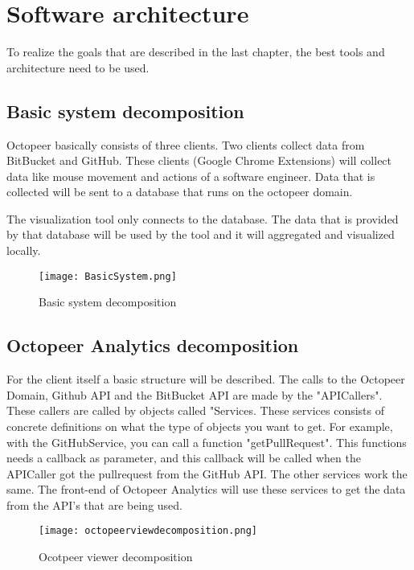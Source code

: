 \documentclass{article}
\begin{document}
\section{Software architecture}

To realize the goals that are described in the last chapter, the best tools and architecture need to be used.

\subsection{Basic system decomposition}

Octopeer basically consists of three clients. Two clients collect data from BitBucket and GitHub. These clients (Google Chrome Extensions) will collect data like mouse movement and actions of a software engineer. Data that is collected will be sent to a database that runs on the octopeer domain.

The visualization tool only connects to the database. The data that is provided by that database will be used by the tool and it will aggregated and visualized locally.

\begin{figure}[htp]
\centering
\texttt{[image: BasicSystem.png]}
\caption{Basic system decomposition}
\end{figure}

\subsection{Octopeer Analytics decomposition}

For the client itself a basic structure will be described. The calls to the Octopeer Domain, Github API and the BitBucket API are made by the "APICallers". These callers are called by objects called "Services. These services consists of concrete definitions on what the type of objects you want to get. For example, with the GitHubService, you can call a function "getPullRequest". This functions needs a callback as parameter, and this callback will be called when the APICaller got the pullrequest from the GitHub API. The other services work the same. The front-end of Octopeer Analytics will use these services to get the data from the API's that are being used.

\begin{figure}[htp]
\centering
\texttt{[image: octopeerviewdecomposition.png]}
\caption{Ocotpeer viewer decomposition}
\end{figure}
\end{document}
